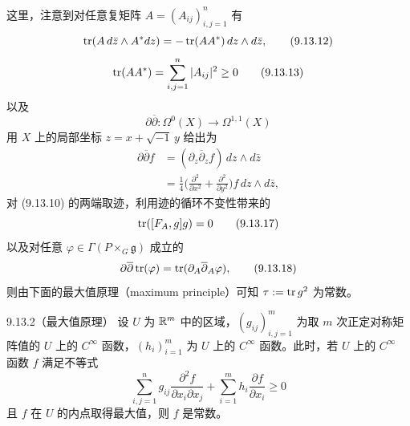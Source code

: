   这里，注意到对任意复矩阵 $A=(A_{ij})_{i,j=1}^n$ 有
  \begin{equation}
    \operatorname{tr}(A\,d\bar z\wedge A^*dz)=-\operatorname{tr}(AA^*)\,dz\wedge d\bar z,
    \tag{9.13.12}
  \end{equation}
  \begin{equation}
    \operatorname{tr}(AA^*)=\sum_{i,j=1}^n|A_{ij}|^2\ge0
    \tag{9.13.13}
  \end{equation}
  以及
  \begin{equation}
    \partial\overline{\partial}\colon\Omega^0(X)\to\Omega^{1,1}(X)
    \tag{9.13.14}
  \end{equation}
  用 $X$ 上的局部坐标 $z=x+\sqrt{-1}\,y$ 给出为
  \begin{align}
    \partial\overline{\partial}f&=(\partial_z\overline{\partial}_zf)\,dz\wedge d\bar z \tag{9.13.15}\\
    &=\frac14\biggl(\frac{\partial^2}{\partial x^2}+\frac{\partial^2}{\partial y^2}\biggr)f\,dz\wedge d\bar z, \tag{9.13.16}
  \end{align}
  对 (9.13.10) 的两端取迹，利用迹的循环不变性带来的
  \begin{equation}
    \operatorname{tr}([F_A,g]g)=0
    \tag{9.13.17}
  \end{equation}
  以及对任意 $\varphi\in\Gamma(P\times_G\mathfrak{g})$ 成立的
  \begin{equation}
    \partial\overline{\partial}\operatorname{tr}(\varphi)=\operatorname{tr}(\partial_A\overline{\partial}_A\varphi),
    \tag{9.13.18}
  \end{equation}
  则由下面的最大值原理（maximum principle）可知 $\tau:=\operatorname{tr} g^2$ 为常数。

\begin{theorem}{9.13.2（最大值原理）}
  设 $U$ 为 $\mathbb{R}^m$ 中的区域，$(g_{ij})_{i,j=1}^m$ 为取 $m$ 次正定对称矩阵值的 $U$ 上的 $C^\infty$ 函数，$(h_i)_{i=1}^m$ 为 $U$ 上的 $C^\infty$ 函数。此时，若 $U$ 上的 $C^\infty$ 函数 $f$ 满足不等式
  \begin{equation}
    \sum_{i,j=1}^n g_{ij}\frac{\partial^2f}{\partial x_i\partial x_j}
    +\sum_{i=1}^m h_i\frac{\partial f}{\partial x_i}\ge0
    \tag{9.13.19}
  \end{equation}
  且 $f$ 在 $U$ 的内点取得最大值，则 $f$ 是常数。
\end{theorem}


